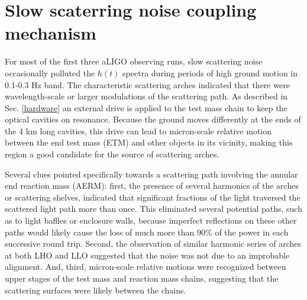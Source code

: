 \documentclass[12pt]{iopart}
\begin{document}
\section{Slow scaterring noise coupling mechanism}\label{m0r0_scattering}
For most of the first three aLIGO observing runs, slow scattering noise occasionally polluted the $h(t)$ spectra during periods of high ground motion in 0.1-0.3 Hz band. The characteristic scattering arches indicated that there were wavelength-scale or larger modulations of the scattering path.
As described in Sec. \ref{hardware} an external drive is applied to the test mass chain to keep the optical cavities on resonance. Because the ground moves differently at the ends of the 4 km long cavities, this drive can lead to micron-scale relative motion between the end test mass (ETM) and other objects in its vicinity, making this region a good candidate for the source of scattering arches.


 
Several clues pointed specifically towards a scattering path involving the annular end reaction mass (AERM): first, the presence of several harmonics of the arches or scattering shelves, indicated that significant fractions of the light traversed the scattered light path more than once. This eliminated several potential paths, such as to light baffles or enclosure walls, because imperfect reflections on these other paths would likely cause the loss of much more than $90\%$ of the power in each successive round trip. Second, the observation of similar harmonic series of arches at both LHO and LLO suggested that the noise was not due to an improbable alignment. And, third, micron-scale relative motions were recognized between upper stages of the test mass and reaction mass chains, suggesting that the scattering surfaces were likely between the chains. 
\end{document}
